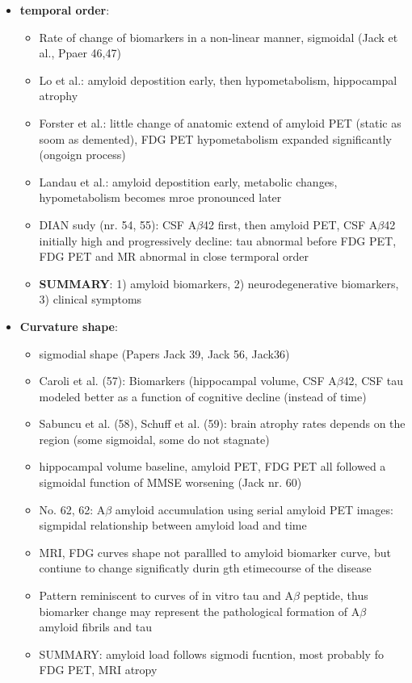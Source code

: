 \documentclass[fleqn]{article}\usepackage{caption}
\begin{document}
\begin{itemize}
\item \textbf{temporal order}:
\begin{itemize}
\item Rate of change of biomarkers in a non-linear manner, sigmoidal (Jack et al., Ppaer 46,47)
\item Lo et al.: amyloid depostition early, then hypometabolism, hippocampal atrophy
\item Forster et al.: little change of anatomic extend of amyloid PET (static as soom as demented), FDG PET hypometabolism expanded significantly  (ongoign process)
\item Landau et al.: amyloid depostition early, metabolic changes, hypometabolism becomes mroe pronounced later 
\item DIAN sudy (nr. 54, 55): CSF A$\beta$42 first, then amyloid PET, CSF A$\beta$42  initially high and progressively decline: tau abnormal before FDG PET, FDG PET and MR abnormal in close termporal order
\item \textbf{SUMMARY}: 1) amyloid biomarkers, 2) neurodegenerative biomarkers, 3) clinical symptoms
\end{itemize}


\item \textbf{Curvature shape}:
\begin{itemize}
\item sigmodial shape (Papers Jack 39, Jack 56, Jack36)
\item Caroli et al. (57): Biomarkers (hippocampal volume, CSF A$\beta$42, CSF tau modeled better as a function of cognitive decline (instead of time)
\item Sabuncu et al. (58), Schuff et al. (59): brain atrophy rates depends on the region (some sigmoidal, some do not stagnate)
\item  hippocampal volume baseline, amyloid PET, FDG PET all followed a sigmoidal function of MMSE worsening   (Jack nr. 60)
\item No. 62, 62: A$\beta$ amyloid accumulation using serial amyloid PET images: sigmpidal relationship between amyloid load and time
\item MRI, FDG curves shape not parallled to amyloid biomarker curve, but contiune to change significatly durin gth etimecourse of the disease
\item Pattern reminiscent to curves of in vitro tau and A$\beta$ peptide, thus biomarker change may represent the  pathological formation of A$\beta$ amyloid fibrils and tau
\item SUMMARY: amyloid load follows sigmodi fucntion, most probably fo FDG PET, MRI atropy
\end{itemize}


\end{itemize}
\end{document}
